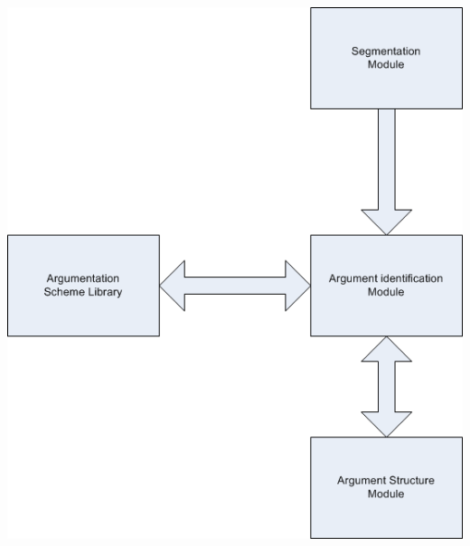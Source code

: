 \documentclass[lnbip]{svmultln}
\begin{document}
\begin{center}
\includegraphics{NLP_Architecture.png}
\end{center}
\end{document}
